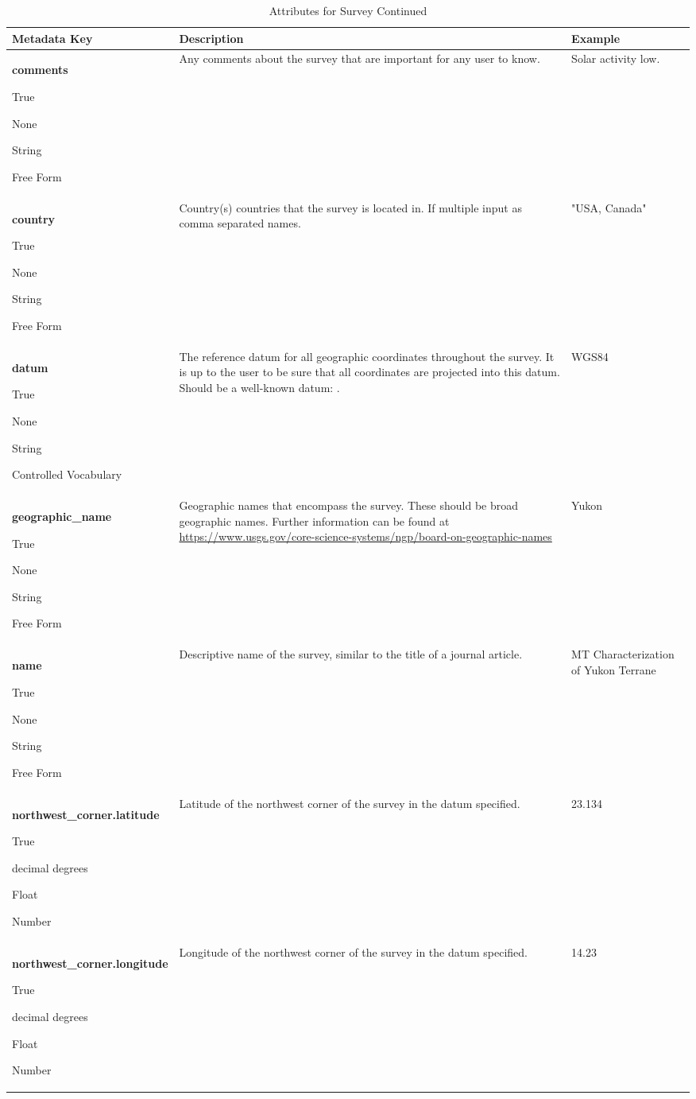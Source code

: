 \documentclass[12pt]{article}
\newcommand{\entry}[7]{
	\textbf{#1} 
	\begin{itemize}[topsep=5pt,itemsep=-.1pt,parsep=-2pt,partopsep=0pt,labelwidth=2em,align=left,itemindent=1em]
		\begin{small}
			\item[Required:] #2
			\item[Units:] #3
			\item[Type:] #4
			\item[Style:] #5
		\end{small}
	\end{itemize} & #6 & #7 \\ \midrule}
\begin{document}
\begin{table}[h!]
	\caption*{Attributes for Survey  Continued}
	\begin{tabular}{p{}>{\raggedright}p{}p{}}
		\textbf{Metadata Key} & \textbf{Description} & \textbf{Example} \\ \toprule
		\entry{comments}{True}{None}{String}{Free Form}{Any comments about the survey that are important for any user to know.}{Solar activity low.}	
		\entry{country}{True}{None}{String}{Free Form}{Country(s) countries that the survey is located in. If multiple input as comma separated names.}{"USA, Canada"}
		\entry{datum}{True}{None}{String}{Controlled Vocabulary}{The reference datum for all geographic coordinates throughout the survey. It is up to the user to be sure that all coordinates are projected into this datum.  Should be a well-known datum: \qquad [ WGS84 $|$ NAD83 $|$ OSGB36 $|$ GDA94 $|$ ETRS89 $|$ PZ-90.11 $|$ other ].}{WGS84}
		\entry{geographic\_name}{True}{None}{String}{Free Form}{Geographic names that encompass the survey.  These should be broad geographic names.  Further information can be found at \url{https://www.usgs.gov/core-science-systems/ngp/board-on-geographic-names}}{Yukon}
		\entry{name}{True}{None}{String}{Free Form}{Descriptive name of the survey, similar to the title of a journal article.}{MT Characterization of Yukon Terrane}
		\entry{northwest\_corner.latitude}{True}{decimal degrees}{Float}{Number}{Latitude of the northwest corner of the survey in the datum specified.}{23.134}
		\entry{northwest\_corner.longitude}{True}{decimal degrees}{Float}{Number}{Longitude of the northwest corner of the survey in the datum specified.}{14.23}
	
	\end{tabular}
	\label{tab:survey2}
\end{table} 

\clearpage
\newpage
\end{document}
